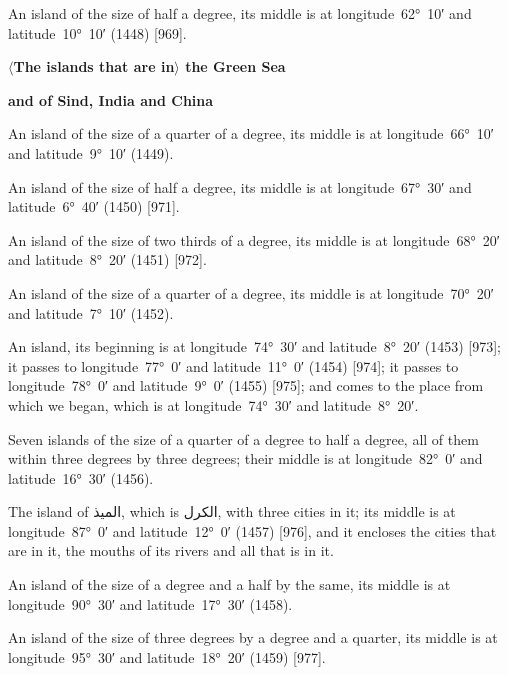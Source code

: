 \documentclass[11pt]{article}
\newcommand{\Pg}[1]{\marginpar{\footnotesize #1}}
\newcommand{\Ang}[1]{\ensuremath{#1}}
\begin{document}
An island of the size of half a degree, its middle is at longitude~62°~10′ and latitude~10°~10′ (1448) [969].

\par\medskip\begin{center}\bfseries \Ang{\langle}The islands that are in\Ang{\rangle} the Green Sea\end{center}\par

\par\medskip\begin{center}\bfseries and of Sind, India and China\end{center}\par

An island of the size of a quarter of a degree, its middle is at longitude~66°~10′ and latitude~9°~10′ (1449).

An island of the size of half a degree, its middle is at longitude~67°~30′ and latitude~6°~40′ (1450) [971].

An island of the size of two thirds of a degree, its middle is at longitude~68°~20′ and latitude~8°~20′ (1451) [972].

An island of the size of a quarter of a degree, its middle is at longitude~70°~20′ and latitude~7°~10′ (1452).

An island, its beginning is at longitude~74°~30′ and latitude~8°~20′ (1453) [973]\Pg{p. 95}; it passes to longitude~77°~0′ and latitude~11°~0′ (1454) [974]; it passes to longitude~78°~0′ and latitude~9°~0′ (1455) [975]; and comes to the place from which we began, which is at longitude~74°~30′ and latitude~8°~20′.

Seven islands of the size of a quarter of a degree to half a degree, all of them within three degrees by three degrees; their middle is at longitude~82°~0′ and latitude~16°~30′ (1456).

The island of \textarabic{الميذ}, which is \textarabic{الكرل}, with three cities in it; its middle is at longitude~87°~0′ and latitude~12°~0′ (1457) [976], and it encloses the cities that are in it, the mouths of its rivers and all that is in it.

An island of the size of a degree and a half by the same, its middle is at longitude~90°~30′ and latitude~17°~30′ (1458).

An island of the size of three degrees by a degree and a quarter, its middle is at longitude~95°~30′ and latitude~18°~20′ (1459) [977].
\end{document}
